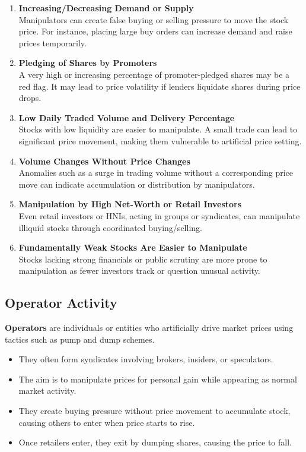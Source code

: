 \documentclass[12pt]{article}
\begin{document}
\begin{enumerate}
    \item \textbf{Increasing/Decreasing Demand or Supply}\\
    Manipulators can create false buying or selling pressure to move the stock price. For instance, placing large buy orders can increase demand and raise prices temporarily.

    \item \textbf{Pledging of Shares by Promoters}\\
    A very high or increasing percentage of promoter-pledged shares may be a red flag. It may lead to price volatility if lenders liquidate shares during price drops.

    \item \textbf{Low Daily Traded Volume and Delivery Percentage}\\
    Stocks with low liquidity are easier to manipulate. A small trade can lead to significant price movement, making them vulnerable to artificial price setting.

    \item \textbf{Volume Changes Without Price Changes}\\
    Anomalies such as a surge in trading volume without a corresponding price move can indicate accumulation or distribution by manipulators.

    \item \textbf{Manipulation by High Net-Worth or Retail Investors}\\
    Even retail investors or HNIs, acting in groups or syndicates, can manipulate illiquid stocks through coordinated buying/selling.

    \item \textbf{Fundamentally Weak Stocks Are Easier to Manipulate}\\
    Stocks lacking strong financials or public scrutiny are more prone to manipulation as fewer investors track or question unusual activity.
\end{enumerate}

\subsection{Operator Activity}

\textbf{Operators} are individuals or entities who artificially drive market prices using tactics such as pump and dump schemes. 

\begin{itemize}
    \item They often form syndicates involving brokers, insiders, or speculators.
    \item The aim is to manipulate prices for personal gain while appearing as normal market activity.
    \item They create buying pressure without price movement to accumulate stock, causing others to enter when price starts to rise.
    \item Once retailers enter, they exit by dumping shares, causing the price to fall.
\end{itemize}
\end{document}

